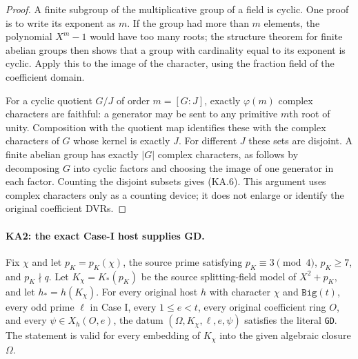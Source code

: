 \begin{proof}
A finite subgroup of the multiplicative group of a field is cyclic.
One proof is to write its exponent as $m$.  If the group had more
than $m$ elements, the polynomial $X^m-1$ would have too many roots;
the structure theorem for finite abelian groups then shows that a
group with cardinality equal to its exponent is cyclic.  Apply this
to the image of the character, using the fraction field of the
coefficient domain.

For a cyclic quotient $G/J$ of order $m=[G:J]$, exactly
$\varphi(m)$ complex characters are faithful: a generator may be
sent to any primitive $m$th root of unity.  Composition with the
quotient map identifies these with the complex characters of $G$
whose kernel is exactly $J$.  For different $J$ these sets are
disjoint.  A finite abelian group has exactly $|G|$ complex
characters, as follows by decomposing $G$ into cyclic factors and
choosing the image of one generator in each factor.  Counting the
disjoint subsets gives (KA.6).  This argument uses complex
characters only as a counting device; it does not enlarge or
identify the original coefficient DVRs.
\end{proof}

\paragraph{KA2: the exact Case-I host supplies GD.}
\label{claim:KA2}
Fix $\chi$ and let $p_K=p_K(\chi)$, the source prime satisfying
$p_K\equiv3\pmod4$, $p_K\ge7$, and $p_K\nmid q$.
Let $K_\chi=K_*(p_K)$ be the source splitting-field model of
$X^2+p_K$, and let $h_*=h(K_\chi)$.
For every original host $h$ with character $\chi$ and
$\texttt{Big}(t)$, every odd prime $\ell$ in Case I, every
$1\le e<t$, every original coefficient ring $O$, and every
$\psi\in X_h(O,e)$, the datum
$(\Omega,K_\chi,\ell,e,\psi)$ satisfies the literal \texttt{GD}.
The statement is valid for every embedding of $K_\chi$ into the
given algebraic closure $\Omega$.

